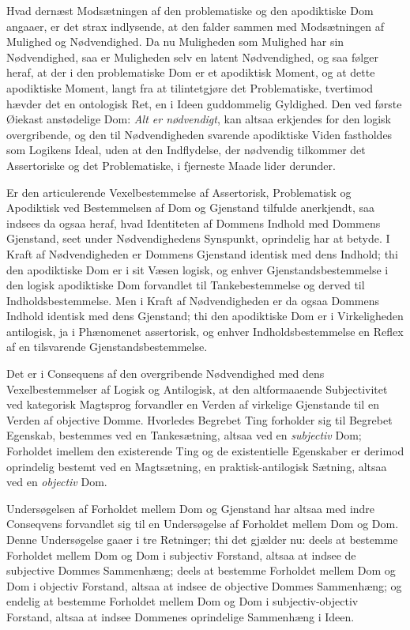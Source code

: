 \documentclass[12pt]{book}
\newcommand{\opage}[1]{\marginnote{\footnotesize\textit{[#1]}}}
\begin{document}
Hvad dernæst Modsætningen af den problematiske og den
apodiktiske Dom angaaer, er det strax indlysende, at den falder
sammen med Modsætningen af Mulighed og Nødvendighed.
Da nu Muligheden som Mulighed har sin Nødvendighed,
saa er Muligheden selv en latent Nødvendighed, og saa følger
heraf, at der i den problematiske Dom er et apodiktisk Moment,
og at dette apodiktiske Moment, langt fra at tilintetgjøre det
Problematiske, tvertimod hævder det en ontologisk Ret, en i
Ideen guddommelig Gyldighed. Den ved første Øiekast anstødelige
Dom: \emph{Alt er nødvendigt}, kan altsaa erkjendes
for den logisk overgribende, og den til Nødvendigheden svarende
apodiktiske Viden fastholdes som Logikens Ideal, uden
at den Indflydelse, der nødvendig tilkommer det Assertoriske
og det Problematiske, i fjerneste Maade lider derunder.

Er den articulerende Vexelbestemmelse af Assertorisk,
Problematisk og Apodiktisk ved Bestemmelsen af Dom og
Gjenstand tilfulde anerkjendt, saa indsees da ogsaa heraf, hvad
Identiteten af Dommens Indhold med Dommens Gjenstand,
seet under Nødvendighedens Synspunkt, oprindelig har at
betyde. I Kraft af Nødvendigheden er Dommens Gjenstand
identisk med dens Indhold; thi den apodiktiske Dom er i sit
Væsen logisk, og enhver Gjenstandsbestemmelse i den logisk
apodiktiske Dom forvandlet til Tankebestemmelse og derved til
Indholdsbestemmelse. Men i Kraft af Nødvendigheden er da
ogsaa Dommens Indhold identisk med dens Gjenstand; thi
den apodiktiske Dom er i Virkeligheden antilogisk, ja i Phænomenet
assertorisk, og enhver Indholdsbestemmelse en Reflex
af en tilsvarende Gjenstandsbestemmelse.

Det er i Consequens af den overgribende Nødvendighed
med dens Vexelbestemmelser af Logisk og Antilogisk, at den
altformaaende Subjectivitet ved kategorisk Magtsprog forvandler
en Verden af virkelige Gjenstande til en Verden af objective
\opage{292}Domme. Hvorledes Begrebet Ting forholder sig til Begrebet
Egenskab, bestemmes ved en Tankesætning, altsaa ved en \emph{subjectiv}
Dom; Forholdet imellem den existerende Ting og de
existentielle Egenskaber er derimod oprindelig bestemt ved en
Magtsætning, en praktisk-antilogisk Sætning, altsaa ved en
\emph{objectiv} Dom.

Undersøgelsen af Forholdet mellem Dom og Gjenstand
har altsaa med indre Conseqvens forvandlet sig til en Undersøgelse
af Forholdet mellem Dom og Dom. Denne Undersøgelse
gaaer i tre Retninger; thi det gjælder nu: deels
at bestemme Forholdet mellem Dom og Dom i subjectiv Forstand,
altsaa at indsee de subjective Dommes Sammenhæng;
deels at bestemme Forholdet mellem Dom og Dom i objectiv
Forstand, altsaa at indsee de objective Dommes Sammenhæng;
og endelig at bestemme Forholdet mellem Dom og Dom i subjectiv-objectiv
Forstand, altsaa at indsee Dommenes oprindelige
Sammenhæng i Ideen.
\end{document}
